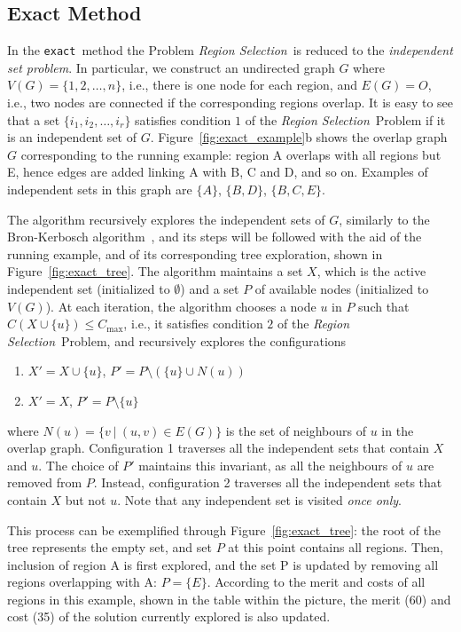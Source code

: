 \documentclass[]{usiinfthesis}
\newcommand{\exact}{\texttt{exact}}
\newcommand{\rsprobname}{\emph{Region Selection}}
\begin{document}
\subsection{Exact Method}
\label{sec:algo-exact}

In the \exact\ method the Problem \rsprobname\ is reduced to the
\emph{independent set problem}. In particular, we construct an
undirected graph $G$ where $V(G) = \{ 1, 2, \ldots, n \}$, i.e., there
is one node for each region, and $E(G) = O$, i.e., two nodes are
connected if the corresponding regions overlap. It is easy to see that
a set $\{ i_1, i_2, \ldots, i_r \}$ satisfies condition $1$ of the
\rsprobname\ Problem if it is an independent set of $G$.
Figure~\ref{fig:exact_example}b shows the overlap graph $G$
corresponding to the running example: region A overlaps with all
regions but E, hence edges are added linking A with B, C and D, and so
on. Examples of independent sets in this graph are $\{A\}$, $\{B,D\}$,
$\{B,C,E\}$.\par

The algorithm recursively explores the independent sets of $G$,
similarly to the Bron-Kerbosch algorithm~\cite{BronKerbosch73}, and
its steps will be followed with the aid of the running example, and
of its corresponding tree exploration, shown in
Figure~\ref{fig:exact_tree}. The algorithm maintains a set $X$, which
is the active independent set (initialized to $\emptyset$) and a set
$P$ of available nodes (initialized to $V(G)$). At each iteration, the
algorithm chooses a node $u$ in $P$ such that $C(X\cup \{u\})\le
C_{\max}$, i.e., it satisfies condition $2$ of the \rsprobname\ Problem,
and recursively explores the configurations
\begin{enumerate}
\item $X' = X\cup \{u\}$, $P' = P\setminus (\{u\}\cup N(u))$
\item $X' = X$, $P' = P\setminus \{u\}$
\end{enumerate}

where $N(u) = \{ v\ |\ (u,v)\in E(G) \}$ is the set of neighbours of
$u$ in the overlap graph.
Configuration 1 traverses all the independent sets that contain $X$
and $u$. The choice of $P'$ maintains this invariant, as all the
neighbours of $u$ are removed from $P$. Instead, configuration 2
traverses all the independent sets that contain $X$ but not $u$. Note
that any independent set is visited \emph{once only}.

This process can be exemplified through Figure~\ref{fig:exact_tree}:
the root of the tree represents the empty set, and set $P$ at this
point contains all regions. Then, inclusion of region A is first
explored, and the set P is updated by removing all regions overlapping
with A: $P = \{E\}$. According to the merit and costs of all regions
in this example, shown in the table within the picture, the merit (60)
and cost (35) of the solution currently explored is also updated.
\end{document}
